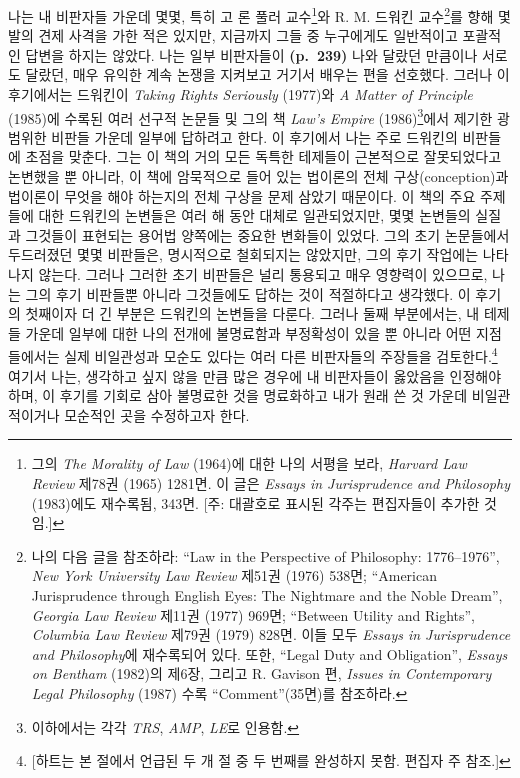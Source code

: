 나는 내 비판자들 가운데 몇몇, 특히 고 론 풀러 교수\footnote{그의
  \emph{The Morality of Law} (1964)에 대한 나의 서평을 보라,
  \emph{Harvard Law Review} 제78권 (1965) 1281면. 이 글은 \emph{Essays
  in Jurisprudence and Philosophy} (1983)에도 재수록됨, 343면. {[}주:
  대괄호로 표시된 각주는 편집자들이 추가한 것임.{]}}와 R. M. 드워킨
교수\footnote{나의 다음 글을 참조하라: “Law in the Perspective of
  Philosophy: 1776--1976”, \emph{New York University Law Review} 제51권
  (1976) 538면; “American Jurisprudence through English Eyes: The
  Nightmare and the Noble Dream”, \emph{Georgia Law Review} 제11권
  (1977) 969면; “Between Utility and Rights”, \emph{Columbia Law
  Review} 제79권 (1979) 828면. 이들 모두 \emph{Essays in Jurisprudence
  and Philosophy}에 재수록되어 있다. 또한, “Legal Duty and
  Obligation”, \emph{Essays on Bentham} (1982)의 제6장, 그리고 R.
  Gavison 편, \emph{Issues in Contemporary Legal Philosophy} (1987) 수록
  “Comment”(35면)를 참조하라.}를 향해 몇 발의 견제 사격을 가한 적은
있지만, 지금까지 그들 중 누구에게도 일반적이고 포괄적인 답변을 하지는
않았다. 나는 일부 비판자들이 \textbf{(p.~239)} 나와 달랐던 만큼이나
서로도 달랐던, 매우 유익한 계속 논쟁을 지켜보고 거기서 배우는 편을
선호했다. 그러나 이 후기에서는 드워킨이 \emph{Taking Rights Seriously}
(1977)와 \emph{A Matter of Principle} (1985)에 수록된 여러 선구적 논문들
및 그의 책 \emph{Law's Empire} (1986)\footnote{이하에서는 각각
  \emph{TRS}, \emph{AMP}, \emph{LE}로 인용함.}에서 제기한 광범위한
비판들 가운데 일부에 답하려고 한다. 이 후기에서 나는 주로 드워킨의
비판들에 초점을 맞춘다. 그는 이 책의 거의 모든 독특한 테제들이
근본적으로 잘못되었다고 논변했을 뿐 아니라, 이 책에 암묵적으로 들어 있는
법이론의 전체 구상(conception)과 법이론이 무엇을 해야 하는지의 전체
구상을 문제 삼았기 때문이다. 이 책의 주요 주제들에 대한 드워킨의
논변들은 여러 해 동안 대체로 일관되었지만, 몇몇 논변들의 실질과 그것들이
표현되는 용어법 양쪽에는 중요한 변화들이 있었다. 그의 초기 논문들에서
두드러졌던 몇몇 비판들은, 명시적으로 철회되지는 않았지만, 그의 후기
작업에는 나타나지 않는다. 그러나 그러한 초기 비판들은 널리 통용되고 매우
영향력이 있으므로, 나는 그의 후기 비판들뿐 아니라 그것들에도 답하는 것이
적절하다고 생각했다. 이 후기의 첫째이자 더 긴 부분은 드워킨의 논변들을
다룬다. 그러나 둘째 부분에서는, 내 테제들 가운데 일부에 대한 나의 전개에
불명료함과 부정확성이 있을 뿐 아니라 어떤 지점들에서는 실제 비일관성과
모순도 있다는 여러 다른 비판자들의 주장들을 검토한다.\footnote{{[}하트는
  본 절에서 언급된 두 개 절 중 두 번째를 완성하지 못함. 편집자 주
  참조.{]}} 여기서 나는, 생각하고 싶지 않을 만큼 많은 경우에 내
비판자들이 옳았음을 인정해야 하며, 이 후기를 기회로 삼아 불명료한 것을
명료화하고 내가 원래 쓴 것 가운데 비일관적이거나 모순적인 곳을
수정하고자 한다.


